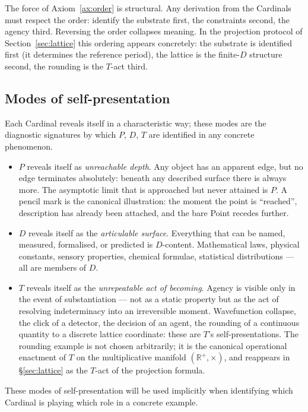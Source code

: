 \documentclass[11pt,a4paper]{article}
\theoremstyle{definition}
\theoremstyle{remark}
\newcommand{\R}{\mathbb{R}}
\begin{document}
The force of Axiom~\ref{ax:order} is structural. Any derivation from the Cardinals must respect the order: identify the substrate first, the constraints second, the agency third. Reversing the order collapses meaning. In the projection protocol of Section~\ref{sec:lattice} this ordering appears concretely: the substrate is identified first (it determines the reference period), the lattice is the finite-$D$ structure second, the rounding is the $T$-act third.

\subsection{Modes of self-presentation}\label{subsec:modes}

Each Cardinal reveals itself in a characteristic way; these modes are the diagnostic signatures by which $P$, $D$, $T$ are identified in any concrete phenomenon.

\begin{itemize}[leftmargin=*]
\item $P$ reveals itself as \emph{unreachable depth}. Any object has an apparent edge, but no edge terminates absolutely: beneath any described surface there is always more. The asymptotic limit that is approached but never attained is $P$. A pencil mark is the canonical illustration: the moment the point is ``reached'', description has already been attached, and the bare Point recedes further.
\item $D$ reveals itself as the \emph{articulable surface}. Everything that can be named, measured, formalised, or predicted is $D$-content. Mathematical laws, physical constants, sensory properties, chemical formulae, statistical distributions --- all are members of $D$.
\item $T$ reveals itself as the \emph{unrepeatable act of becoming}. Agency is visible only in the event of substantiation --- not as a static property but as the act of resolving indeterminacy into an irreversible moment. Wavefunction collapse, the click of a detector, the decision of an agent, the rounding of a continuous quantity to a discrete lattice coordinate: these are $T$'s self-presentations. The rounding example is not chosen arbitrarily; it is the canonical operational enactment of $T$ on the multiplicative manifold $(\R^{+},\times)$, and reappears in \S\ref{sec:lattice} as the $T$-act of the projection formula.
\end{itemize}

These modes of self-presentation will be used implicitly when identifying which Cardinal is playing which role in a concrete example.
\end{document}
